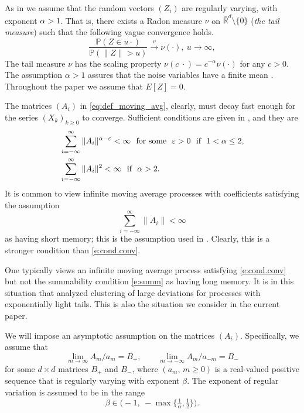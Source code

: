 \documentclass[11pt,reqno]{amsart}
\numberwithin{equation}{section}
\theoremstyle{definition}
\theoremstyle{remark}
\theoremstyle{definition}
\newcommand{\PP}{\mathbb{P}}
\newcommand{\RR}{\mathbb{R}}
\newcommand{\vep}{\varepsilon}
\begin{document}
 As in \cite{wang:samorodnitsky:2025} we assume that 
the random vectors $(Z_i)$ are  regularly varying, with exponent
$\alpha>1$.  That is,
there exists a Radon measure $\nu$  on $\bar{\RR}^d \setminus \{0\}$
({\it   the tail measure}) such that the following vague convergence holds. 
\begin{equation}\label{eq:def_regular_varying_Rd}
    \frac{\PP(Z \in u \cdot)}{\PP(\|Z\| > u)} \xrightarrow{v}
    \nu(\cdot), \ u\to\infty, 
\end{equation}
The tail measure $\nu$ has the scaling property  $\nu(c \; \cdot) =
c^{-\alpha} \nu (\cdot)$ for any $c> 0$.  The assumption  $\alpha>1$
assures that the noise variables have a finite mean .
Throughout the paper we  assume  that $E[Z] = 0$. 

The matrices $(A_i)$ in \eqref{eq:def_moving_avg}, clearly, must
decay fast enough for the series $(X_k)_{k\geq 0}$ to converge. Sufficient conditions
are given in \cite{hult:samorodnitsky:2008}, and they are
\begin{align} \label{e:cond.conv}
&\sum_{i=-\infty}^\infty \|A_i\|^{\alpha-\vep}<\infty \ \ \text{for
                                    some} \ \ \vep>0 \ \ \text{if} \
                                    \ 1<\alpha\leq 2,\\
\notag &\sum_{i=-\infty}^\infty \|A_i\|^{2}<\infty \ \ \text{if} \
                                    \ \alpha>2.
\end{align}
It is common to view infinite moving average processes with
coefficients satisfying the assumption
\begin{equation} \label{e:summ}
\sum_{i=-\infty}^\infty \|A_i\|<\infty
\end{equation}
as having short memory; this is the assumption used in
\cite{wang:samorodnitsky:2025}. Clearly,   this is
a stronger condition than \eqref{e:cond.conv}.

One typically views an infinite moving average process
satisfying \eqref{e:cond.conv} but not the summability condition
\eqref{e:summ} as having long memory. It is in this situation that
\cite{chakrabarty:samorodnitsky:2023} analyzed clustering of large
deviations for processes with exponentially light tails. This is also
the situation we consider in the current paper.

We will impose an asymptotic assumption on the matrices
$(A_i)$. Specifically, we assume that
\begin{equation}\label{eq:def_coeff1}
   \lim_{m\to\infty} A_m/a_m = B_+, 
   \qquad 
   \lim_{m\to -\infty} A_m/a_{-m} = B_-
 \end{equation}
 for some $d\times d$ matrices $B_+$ and $B_-$, where
 $(a_m, \, m\geq 0) $ is a real-valued positive sequence that is regularly varying
 with exponent $\beta$. The exponent of regular variation is assumed
 to be in the range 
\begin{equation} \label{e:beta.tange}
    \beta \in \Big(-1,\; -\max\Big\{\tfrac{1}{\alpha}, \tfrac{1}{2}\Big\}\Big).
\end{equation} 
\end{document}
